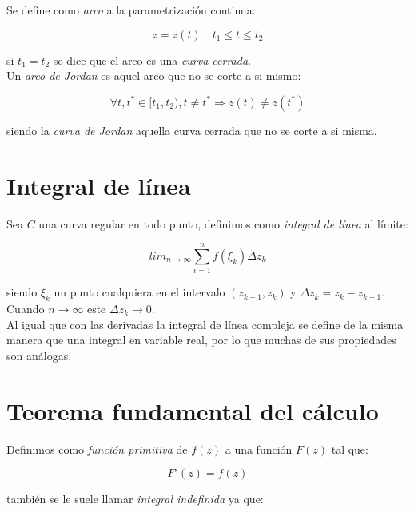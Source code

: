 \documentclass[12pt]{book}
\begin{document}
Se define como \textit{arco} a la parametrización continua:

\begin{equation}
z=z(t) \quad t_1 \leq t \leq t_2
\end{equation}

si $t_1 = t_2$ se dice que el arco es una \textit{curva cerrada}.  \\

Un \textit{arco de Jordan} es aquel arco que no se corte a si mismo:

\begin{equation}
\forall t,t^* \in [t_1,t_2), t\neq t^* \Longrightarrow z(t)\neq z(t^*)
\end{equation}

siendo la \textit{curva de Jordan} aquella curva cerrada que no se corte a si misma.

\section{Integral de línea}

Sea $C$ una curva regular en todo punto, definimos como \textit{integral de línea} al límite:

\begin{equation}
lim_{n \rightarrow \infty} \sum_{i=1}^n f( \xi_k) \Delta z_k
\end{equation}

siendo $\xi_k$ un punto cualquiera en el intervalo $(z_{k-1},z_k)$ y $\Delta z_k = z_k-z_{k-1}$.  Cuando $n \rightarrow \infty$ este $\Delta z_k \rightarrow 0$. \\

Al igual que con las derivadas la integral de línea compleja se define de la misma manera que una integral en variable real, por lo que muchas de sus propiedades son análogas. \\

\section{Teorema fundamental del cálculo}

Definimos como \textit{función primitiva} de $f(z)$ a una función $F(z)$ tal que:

\begin{equation}
F'(z) = f(z)
\end{equation}

también se le suele llamar \textit{integral indefinida} ya que:
\end{document}
